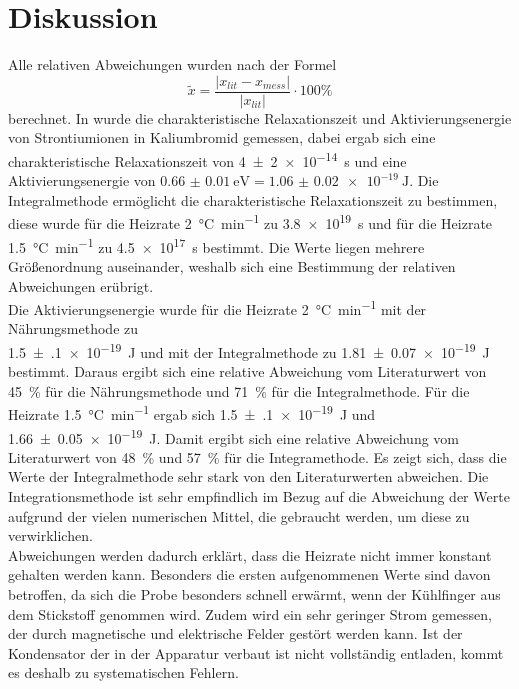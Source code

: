 \section{Diskussion}
\label{sec:Diskussion}
Alle relativen Abweichungen wurden nach der Formel
\begin{equation*}
  \tilde{x} = \frac{ \lvert x_{lit} - x_{mess} \rvert}{\lvert x_{lit} \rvert}
  \cdot 100 \%
\end{equation*}
berechnet. 
In \cite{paper} wurde die charakteristische Relaxationszeit und Aktivierungsenergie von 
Strontiumionen in Kaliumbromid gemessen, dabei ergab sich eine charakteristische Relaxationszeit 
von \SI{4(2)e-14}{\second} und eine Aktivierungsenergie von 
$\SI{0.66(1)}{\eV} = \SI{1.06(2)e-19}{\joule}$.
Die Integralmethode ermöglicht die charakteristische Relaxationszeit zu bestimmen, diese wurde 
für die Heizrate \SI{2}{\celsius\per\minute} zu \SI{3.8e+19}{\second} und für die Heizrate 
\SI{1.5}{\celsius\per\minute} zu \SI{4.5e+17}{\second} bestimmt. Die Werte liegen mehrere 
Größenordnung auseinander, weshalb sich eine Bestimmung der relativen Abweichungen erübrigt.\\
Die Aktivierungsenergie wurde für die Heizrate \SI{2}{\celsius\per\minute} mit der Nährungsmethode 
zu \\\SI{1.5(1)e-19}{\joule} und mit der Integralmethode zu \SI{1.81(7)e-19}{\joule} bestimmt. 
Daraus ergibt sich eine relative Abweichung vom Literaturwert von \SI{45}{\percent} 
für die Nährungsmethode und \SI{71}{\percent} für die Integralmethode. Für die Heizrate 
\SI{1.5}{\celsius\per\minute} ergab sich \SI{1.5(1)e-19}{\joule} und \SI{1.66(5)e-19}{\joule}. 
Damit ergibt sich eine relative Abweichung vom Literaturwert von \SI{48}{\percent} und 
\SI{57}{\percent} für die Integramethode. Es zeigt sich, dass die Werte der Integralmethode 
sehr stark von den Literaturwerten abweichen. Die Integrationsmethode ist sehr 
empfindlich im Bezug auf die Abweichung der Werte aufgrund der vielen numerischen Mittel, 
die gebraucht werden, um diese zu verwirklichen.\\
Abweichungen werden dadurch erklärt, dass die Heizrate nicht immer konstant gehalten werden kann. 
Besonders die ersten aufgenommenen Werte sind davon betroffen, da sich die Probe besonders schnell 
erwärmt, wenn der Kühlfinger aus dem Stickstoff genommen wird. Zudem wird ein sehr geringer Strom 
gemessen, der durch magnetische und elektrische Felder gestört werden kann. 
Ist der Kondensator der in 
der Apparatur verbaut ist nicht vollständig entladen, kommt es deshalb zu systematischen Fehlern. 

